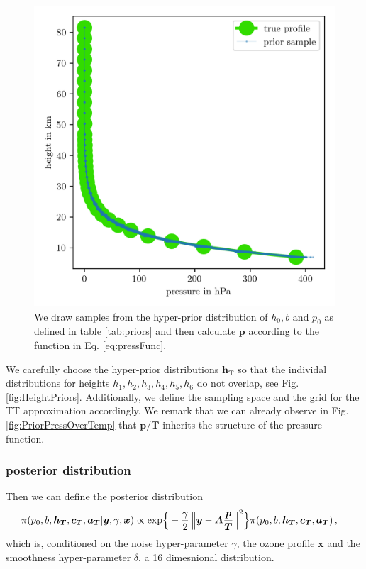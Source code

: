 \begin{figure}[ht!]
	\centering
	\includegraphics{PriorPressPostMeanSigm.png}
	\caption[Prior Samples of $\bm{p}$ according to the respective hyper-prior distribution.]{We draw samples from the hyper-prior distribution of $h_0, b$ and $p_0$ as defined in table \ref{tab:priors} and then calculate $\bm{p}$ according to the function in Eq. \ref{eq:pressFunc}.}
	\label{fig:PriorPress}
\end{figure}


We carefully choose the hyper-prior distributions $\bm{h}_{\bm{T}} $ so that the individal distributions for heights $h_1, h_2, h_3, h_4,h_5,h_6$ do not overlap, see Fig. \ref{fig:HeightPriors}.
Additionally, we define the sampling space and the grid for the TT approximation accordingly.
We remark that we can already observe in Fig. \ref{fig:PriorPressOverTemp} that $\bm{p}/\bm{T}$ inherits the structure of the pressure function.

\subsubsection{posterior distribution}
Then we can define the posterior distribution
\begin{align}
		\pi(p_0,b,\bm{h_T},\bm{c_T},\bm{a_T} | \bm{y}, \gamma, \bm{x}) \propto  \exp\Bigl\{ & -\frac{\gamma}{2} \left\Vert \bm{y}- \bm{A} \frac{\bm{p}}{\bm{T}}  \right\Vert^2 \Bigr\} \pi(p_0,b,\bm{h_T},\bm{c_T},\bm{a_T})\, ,
\end{align}
which is, conditioned on the noise hyper-parameter $\gamma$, the ozone profile $\bm{x}$ and the smoothness hyper-parameter $\delta$, a 16 dimesnional distribution.
\clearpage


